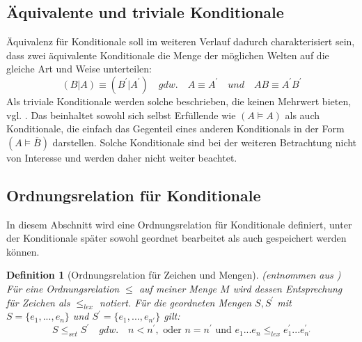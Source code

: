 \documentclass[12pt,a4paper]{article}
\newtheorem{theorem}{Definition}
\begin{document}
\subsection{Äquivalente und triviale Konditionale}
\label{sec:äquivalenz-konditionale}
Äquivalenz für Konditionale soll im weiteren Verlauf dadurch charakterisiert sein, dass zwei äquivalente Konditionale die Menge der möglichen Welten auf die gleiche Art und Weise unterteilen:
\begin{equation}
(B|A)\equiv (B^\prime|A^\prime) \quad gdw. \quad A\equiv A^\prime \quad und \quad AB \equiv A^\prime B^\prime
\end{equation}
Als triviale Konditionale werden solche beschrieben, die keinen Mehrwert bieten, vgl. \cite{beierle19}. Das beinhaltet sowohl sich selbst Erfüllende wie $(A \models A)$ als auch Konditionale, die einfach das Gegenteil eines anderen Konditionals in der Form $(A \models \overline{B})$ darstellen. Solche Konditionale sind bei der weiteren Betrachtung nicht von Interesse und werden daher nicht weiter beachtet.


\subsection{Ordnungsrelation für Konditionale}
\label{sec:ordnungsrelation}
In diesem Abschnitt wird eine Ordnungsrelation für Konditionale definiert, unter der Konditionale später sowohl geordnet bearbeitet als auch gespeichert werden können.
\begin{theorem}[Ordnungsrelation für Zeichen und Mengen](entnommen aus \cite{beierle19}) \ \\
Für eine Ordnungsrelation $\leqslant$ auf meiner Menge $M$ wird dessen Entsprechung für Zeichen als $\leqslant_{lex}$ notiert. Für die geordneten Mengen $S, S^\prime$ mit $S = \{e_1, ..., e_n\}$ und $S^\prime = \{e_{1}, ... , e_{n\prime}\}$ gilt:
\begin{equation}
 S \leqslant_{set} S ^\prime \quad gdw. \quad n<n^\prime, \text{ oder } n = n ^\prime \text{ und } e_1...e_n  \leqslant_{lex}  e_1^\prime ... e_{n^\prime}^\prime
\end{equation}
\label{def:sortierung-konditionale}
\end{theorem}
\end{document}

